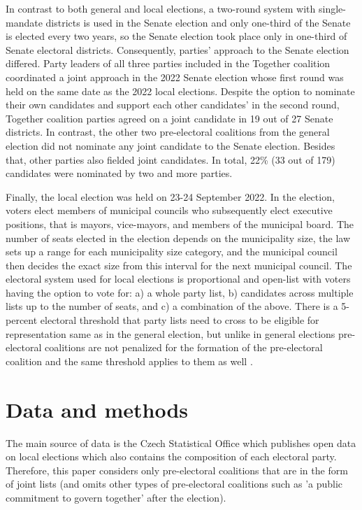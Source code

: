 \documentclass[fignum,12pt,titlepage]{article}
\begin{document}
In contrast to both general and local elections, a two-round system with single-mandate districts is used in the Senate election and only one-third of the Senate is elected every two years, so the Senate election took place only in one-third of Senate electoral districts. Consequently, parties' approach to the Senate election differed. Party leaders of all three parties included in the Together coalition coordinated a joint approach in the 2022 Senate election whose first round was held on the same date as the 2022 local elections. 
Despite the option to nominate their own candidates and support each other candidates' in the second round, Together coalition parties agreed on a joint candidate in 19 out of 27 Senate districts. In contrast, the other two pre-electoral coalitions from the general election did not nominate any joint candidate to the Senate election. Besides that, other parties also fielded joint candidates. In total, 22\% (33 out of 179) candidates were nominated by two and more parties.

Finally, the local election was held on 23-24 September 2022. In the election, voters elect members of municipal councils who subsequently elect executive positions, that is mayors, vice-mayors, and members of the municipal board. The number of seats elected in the election depends on the municipality size, the law sets up a range for each municipality size category, and the municipal council then decides the exact size from this interval for the next municipal council. The electoral system used for local elections is proportional and open-list with voters having the option to vote for: a) a whole party list, b) candidates across multiple lists up to the number of seats, and c) a combination of the above. There is a 5-percent electoral threshold that party lists need to cross to be eligible for representation same as in the general election, but unlike in general elections pre-electoral coalitions are not penalized for the formation of the pre-electoral coalition and the same threshold applies to them as well \parencite{voda2022}.

\section{Data and methods}

The main source of data is the Czech Statistical Office which publishes open data on local elections which also contains the composition of each electoral party. Therefore, this paper considers only pre-electoral coalitions that are in the form of joint lists (and omits other types of pre-electoral coalitions such as 'a public commitment to govern together' after the election). 
\end{document}
